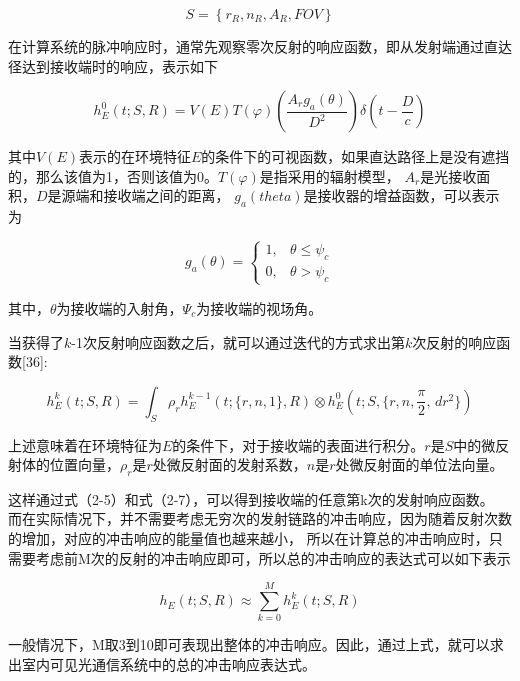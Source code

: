 \begin{equation}
    S=\left\{r_{R},n_{R},A_{R},FOV\right\}
\end{equation}

在计算系统的脉冲响应时，通常先观察零次反射的响应函数，即从发射端通过直达径达到接收端时的响应，表示如下\cite{WuXia2014}

\begin{equation}
    h_{E}^0(t;S,R)=V(E)T(\varphi)(\frac{A_{r}g_{a}(\theta)}{D^2})\delta(t-\frac{D}{c})
\end{equation}

其中$V(E)$表示的在环境特征$E$的条件下的可视函数，如果直达路径上是没有遮挡的，那么该值为1，否则该值为0。$T(\varphi)$是指采用的辐射模型，
$A_{r}$是光接收面积，$D$是源端和接收端之间的距离， $g_{a}(theta)$是接收器的增益函数，可以表示为

\begin{equation}
    g_{a}(\theta)=
    \begin{cases}
        1,  & \theta\le\psi_{c} \\
        0,  & \theta>\psi_{c}
    \end{cases}
\end{equation}

其中，$\theta$为接收端的入射角，$\Psi_{c}$为接收端的视场角。

当获得了$k$-1次反射响应函数之后，就可以通过迭代的方式求出第$k$次反射的响应函数[36]:

\begin{equation}
    h_{E}^k(t;S,R)=\int_{S} \rho_{r}h_{E}^{k-1}(t;\{r,n,1\},R)\otimes h_{E}^0(t;S,\{r,n,\frac{\pi}{2}, \, dr^2\})
\end{equation}

上述意味着在环境特征为$E$的条件下，对于接收端的表面进行积分。$r$是$S$中的微反射体的位置向量，$\rho_{r}$是$r$处微反射面的发射系数，$n$是$r$处微反射面的单位法向量。

这样通过式（2-5）和式（2-7），可以得到接收端的任意第k次的发射响应函数。
而在实际情况下，并不需要考虑无穷次的发射链路的冲击响应，因为随着反射次数的增加，对应的冲击响应的能量值也越来越小，
所以在计算总的冲击响应时，只需要考虑前M次的反射的冲击响应即可，所以总的冲击响应的表达式可以如下表示

\begin{equation}
    h_{E}(t;S,R)\approx \sum_{k=0}^M h_{E}^k(t;S,R)
\end{equation}

一般情况下，M取3到10即可表现出整体的冲击响应\cite{DingJuPeng2005}。因此，通过上式，就可以求出室内可见光通信系统中的总的冲击响应表达式。


